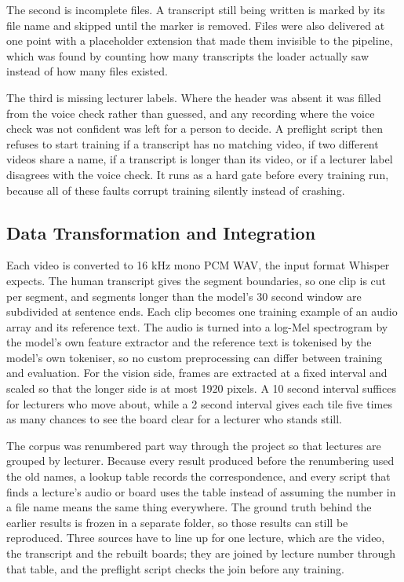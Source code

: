 The second is incomplete files. A transcript still being written is marked by its file
name and skipped until the marker
is removed. Files were also delivered at one point with a placeholder extension that made
them invisible to the pipeline, which was found by counting how many transcripts the
loader actually saw instead of how many files existed.

The third is missing lecturer labels. Where the header was absent it was filled from
the voice check rather than
guessed, and any recording where the voice check was not confident was left for a person
to decide. A preflight script then refuses to start training if a transcript has no matching video, if two
different videos share a name, if a transcript is longer than its video, or if a lecturer
label disagrees with the voice check. It runs as a hard gate before every training run,
because all of these faults corrupt training silently instead of crashing.

\subsection{Data Transformation and Integration}

Each video is converted to 16 kHz mono PCM WAV, the input format Whisper expects. The
human transcript gives the segment boundaries, so one clip is cut per segment, and
segments longer than the model's 30 second window are subdivided at sentence ends. Each
clip becomes one training example of an audio array and its reference text. The audio is
turned into a log-Mel spectrogram by the model's own feature extractor and the reference
text is tokenised by the model's own tokeniser, so no custom preprocessing can differ
between training and evaluation. For the vision side, frames are extracted at a fixed
interval and scaled so that the longer side is at most 1920 pixels. A 10 second interval
suffices for lecturers who move about, while a 2 second interval gives each tile five
times as many chances to see the board clear for a lecturer who stands still.

The corpus was renumbered part way through the project so that lectures are grouped by
lecturer. Because every result produced before the renumbering used the old names, a
lookup table records the correspondence, and every script that finds a lecture's audio or
board uses the table instead of assuming the number in a file name means the same thing
everywhere. The ground truth behind the earlier results is frozen in a separate folder, so
those results can still be reproduced. Three sources have to line up for one lecture,
which are the video, the transcript and the rebuilt boards; they are joined by lecture
number through that table, and the preflight script checks the join before any training.

